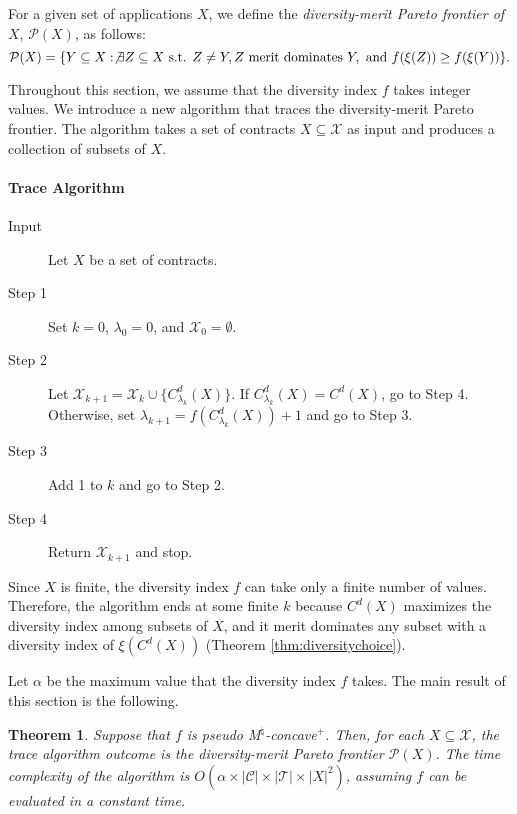 \documentclass[12pt]{amsart}
\newtheorem{theorem}{Theorem}
\theoremstyle{remark}
\begin{document}
For a given set of applications $X$, we define the \emph{diversity-merit
Pareto frontier of $X$}, $\mathcal{P}(X)$, as follows:
\[\mathcal{P}(X)=\{Y\subseteq X : \not\exists
    Z\subseteq X  \mbox { s.t. } Z\neq Y, Z \mbox{ merit dominates } Y, \mbox { and }
    f(\xi(Z))\geq f(\xi(Y))\}.\]

Throughout this section, we assume that the diversity index
$f$ takes integer values.
We introduce a new algorithm that traces the diversity-merit Pareto frontier. The algorithm takes a set of contracts $X\subseteq \mathcal{X}$ as input and produces a collection of subsets of $X$.



\medskip
\paragraph{\textbf{Trace Algorithm}} %

\begin{description}
  \item[Input] Let $X$ be a set of contracts.
  \item[Step 1] Set $k=0$, $\lambda_0=0$, and $\mathcal{X}_0=\emptyset$.
  \item[Step 2] Let $\mathcal{X}_{k+1}=\mathcal{X}_k \cup \{C^d_{\lambda_k}(X)\}$. If
   $C^d_{\lambda_k}(X) = C^d(X)$, go to Step 4. Otherwise, set $\lambda_{k+1}=f(C^d_{\lambda_k}(X))+1$ and go to Step 3.
  \item[Step 3] Add 1 to $k$ and go to Step 2.
  \item[Step 4] Return $\mathcal{X}_{k+1}$ and stop.
\end{description}

Since $X$ is finite, the diversity index $f$ can take only a finite number
of values. Therefore, the algorithm ends at some finite $k$ because
$C^d(X)$ maximizes the diversity index among subsets of $X$, and it merit
dominates any subset with a diversity index of $\xi(C^d(X))$ (Theorem \ref{thm:diversitychoice}).

Let $\alpha$ be the maximum value that the diversity index $f$ takes.
The main result of this section is the following.

\begin{theorem}\label{thm:trace}
Suppose that $f$ is pseudo M$^\natural$-concave$^+$.
Then, for each $X\subseteq \mathcal{X}$, the trace algorithm outcome is the diversity-merit  Pareto frontier $\mathcal{P}(X)$.
The time complexity of the algorithm is $O(\alpha \times |\mathcal{C}| \times |\mathcal{T}| \times |X|^2)$, assuming $f$
can be evaluated in a constant time.
\end{theorem}
\end{document}
